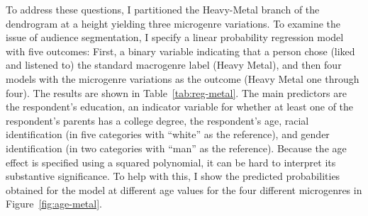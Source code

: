 \documentclass[a4paper,12pt]{extarticle}
\begin{document}
To address these questions, I partitioned the Heavy-Metal branch of the dendrogram at a height yielding three microgenre variations. To examine the issue of audience segmentation, I specify a linear probability regression model with five outcomes: First, a binary variable indicating that a person chose (liked and listened to) the standard macrogenre label (Heavy Metal), and then four models with the microgenre variations as the outcome (Heavy Metal one through four). The results are shown in Table~\ref{tab:reg-metal}. The main predictors are the respondent's education, an indicator variable for whether at least one of the respondent's parents has a college degree, the respondent's age, racial identification (in five categories with ``white'' as the reference), and gender identification (in two categories with ``man'' as the reference). Because the age effect is specified using a squared polynomial, it can be hard to interpret its substantive significance. To help with this, I show the predicted probabilities obtained for the model at different age values for the four different microgenres in Figure~\ref{fig:age-metal}.
\end{document}
